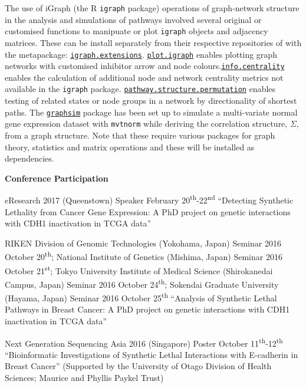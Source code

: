 The use of iGraph (the R \texttt{igraph} package) operations of graph-network structure in the analysis and simulations of pathways involved several original or customised functions to manipuate or plot \texttt{igraph} objects and adjacency matrices. These can be install separately from their respective repositories of with the metapackage: \href{https://github.com/TomKellyGenetics/igraph.extensions}{\texttt{igraph.extensions}}. \href{https://github.com/TomKellyGenetics/plot.igraph}{\texttt{plot.igraph}} enables plotting graph networks with customised inhibitor arrow and node colours.\href{https://github.com/TomKellyGenetics/info.centrality}{\texttt{info.centrality}} enables the calculation of additional node and network centrality metrics not available in the \texttt{igraph} package. \href{https://github.com/TomKellyGenetics/pathway.structure.permutation}{\texttt{pathway\-.structure\-.permutation}} enables testing of related states or node groups in a network by directionality of shortest paths. The \href{https://github.com/TomKellyGenetics/graphsim}{\texttt{graphsim}} package has been set up to simulate a multi-variate normal gene expression dataset with \texttt{mvtnorm} while deriving the correlation structure, $\Sigma$, from a graph structure. Note that these require various packages for graph theory, statistics and matrix operations and these will be installed as dependencies.

\textbf{Conference Participation}

eResearch 2017 (Queenstown) Speaker February 20\textsuperscript{th}-22\textsuperscript{nd}
``Detecting Synthetic Lethality from Cancer Gene Expression: A PhD project on genetic interactions with CDH1 inactivation in TCGA data''

RIKEN Division of Genomic Technologies (Yokohama, Japan) Seminar 2016 October 20\textsuperscript{th};
National Institute of Genetics (Mishima, Japan) Seminar 2016 October 21\textsuperscript{st};
Tokyo University Institute of Medical Science (Shirokanedai Campus, Japan) Seminar 2016 October 24\textsuperscript{th};
Sokendai Graduate University (Hayama, Japan) Seminar 2016 October 25\textsuperscript{th}
``Analysis of Synthetic Lethal Pathways in Breast Cancer: A PhD project on genetic interactions with CDH1 inactivation in TCGA data''

Next Generation Sequencing Asia 2016 (Singapore) Poster October 11\textsuperscript{th}-12\textsuperscript{th}
``Bioinformatic Investigations of Synthetic Lethal Interactions with E-cadherin in Breast Cancer''
(Supported by the University of Otago Division of Health Sciences; Maurice and Phyllis Paykel Trust)

